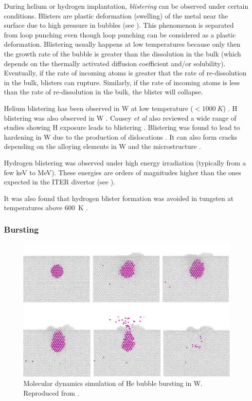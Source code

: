 During helium or hydrogen implantation, \textit{blistering} can be observed under certain conditions.
Blisters are plastic deformation (swelling) of the metal near the surface due to high pressure in bubbles (see ).
This phenomenon is separated from loop punching even though loop punching can be considered as a plastic deformation.
Blistering usually happens at low temperatures because only then the growth rate of the bubble is greater than the dissolution in the bulk (which depends on the thermally activated diffusion coefficient and/or solubility).
Eventually, if the rate of incoming atoms is greater that the rate of re-dissolution in the bulk, blisters can rupture.
Similarly, if the rate of incoming atoms is less than the rate of re-dissolution in the bulk, the blister will collapse.

Helium blistering has been observed in W at low temperature ($< \SI{1000}{K}$) .
H blistering was also observed in W .
Causey \textit{et al} also reviewed a wide range of studies showing H exposure leads to blistering .
Blistering was found to lead to hardening in W due to the production of dislocations .
It can also form cracks depending on the alloying elements in W and the microstructure .

Hydrogen blistering was observed under high energy irradiation (typically from a few \si{keV} to \si{MeV}).
These energies are orders of magnitudes higher than the ones expected in the ITER divertor (see ).

It was also found that hydrogen blister formation was avoided in tungsten at temperatures above \SI{600}{K} .

\subsubsection{Bursting}

\begin{figure} [h!]
    \centering
    \includegraphics[width=\linewidth]{Figures/Chapter1/bubble_bursting_zhou.jpg}
    \caption{Molecular dynamics simulation of He bubble bursting in W. Reproduced from \cite{zhou_growth_2019}.}
    \label{fig: bubble bursting zhou}
\end{figure}

